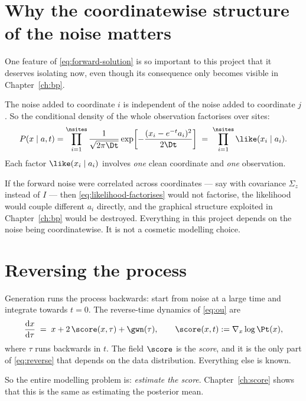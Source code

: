 \section{Why the coordinatewise structure of the noise matters}
\label{sec:coordinatewise}

One feature of \eqref{eq:forward-solution} is so important to this project that it deserves
isolating now, even though its consequence only becomes visible in Chapter~\ref{ch:bp}.

The noise added to coordinate $i$ is independent of the noise added to coordinate $j$. So the
conditional density of the whole observation factorises over sites:
\begin{equation}
\label{eq:likelihood-factorises}
P(x \mid a, t)
= \prod_{i=1}^{\nsites}
\frac{1}{\sqrt{2\pi\Dt}}
\exp\!\left[-\frac{(x_i - e^{-t}a_i)^2}{2\Dt}\right]
\;=\;\prod_{i=1}^{\nsites} \like(x_i \mid a_i).
\end{equation}
Each factor $\like(x_i\mid a_i)$ involves \emph{one} clean coordinate and \emph{one}
observation.

\begin{pitfall}
If the forward noise were correlated across coordinates --- say with covariance $\Sigma_z$
instead of $I$ --- then \eqref{eq:likelihood-factorises} would not factorise, the likelihood
would couple different $a_i$ directly, and the graphical structure exploited in
Chapter~\ref{ch:bp} would be destroyed. Everything in this project depends on the noise being
coordinatewise. It is not a cosmetic modelling choice.
\end{pitfall}

\section{Reversing the process}
\label{sec:reverse}

Generation runs the process backwards: start from noise at a large time and integrate towards
$t=0$. The reverse-time dynamics of \eqref{eq:ou} are
\begin{equation}
\label{eq:reverse}
\frac{\mathrm{d}x}{\mathrm{d}\tau} \;=\; x + 2\,\score(x,\tau) + \gwn(\tau),
\qquad \score(x,t) := \nabla_x \log \Pt(x),
\end{equation}
where $\tau$ runs backwards in $t$. The field $\score$ is the \emph{score}, and it is the only
part of \eqref{eq:reverse} that depends on the data distribution. Everything else is known.

So the entire modelling problem is: \emph{estimate the score}. Chapter~\ref{ch:score} shows
that this is the same as estimating the posterior mean.

